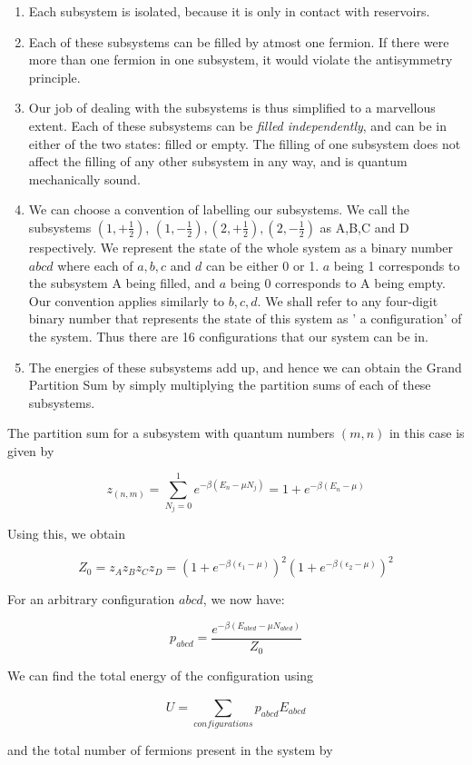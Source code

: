 \documentclass[oneside]{book}
\begin{document}
\begin{enumerate}
\item Each subsystem is isolated, because it is only in contact with reservoirs. 
\item Each of these subsystems can be filled by atmost one fermion. If there were more than one fermion in one subsystem, it would violate the antisymmetry principle. 
\item Our job of dealing with the subsystems is thus simplified to a marvellous extent. Each of these subsystems can be \emph{filled independently}, and can be in either of the two states: filled or empty. The filling of one subsystem does not affect the filling of any other subsystem in any way, and is quantum mechanically sound.
\item We can choose a convention of labelling our subsystems. We call the subsystems $(1,+\frac{1}{2})$, $(1,-\frac{1}{2}), (2,+\frac{1}{2}), (2,-\frac{1}{2})$ as A,B,C and D respectively. We represent the state of the whole system as a binary number $abcd$ where each of $a,b,c$ and $d$ can be either 0 or 1. $a$ being 1 corresponds to the subsystem A being filled, and $a$ being 0 corresponds to A being empty. Our convention applies similarly to $b,c,d$. We shall refer to any four-digit binary number that represents the state of this system as ' a configuration' of the system. Thus there are 16 configurations that our system can be in.
\item The energies of these subsystems add up, and hence we can obtain the Grand Partition Sum by simply multiplying the partition sums of each of these subsystems.
\end{enumerate}

The partition sum for a subsystem with quantum numbers $(m,n)$ in this case is given by

\[z_{(n,m)} =  \sum_{N_j =0}^{1}e^{-\beta(E_n-\mu N_j)} = 1 + e^{-\beta(E_n-\mu)}\]

Using this, we obtain

\[Z_{0} = z_Az_Bz_Cz_D = (1 + e^{-\beta(\epsilon_1-\mu)})^2(1 + e^{-\beta(\epsilon_2-\mu)})^2\]

For an arbitrary configuration $abcd$, we now have:

\[ p_{abcd} = \frac{e^{-\beta (E_{abcd} - \mu N_{abcd})}}{Z_0}\]

We can find the total energy of the configuration using

\[ U = \sum_{configurations}^{}p_{abcd}E_{abcd}\]

and the total number of fermions present in the system by
\end{document}

